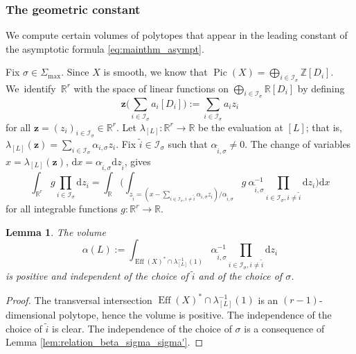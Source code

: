 \documentclass[11pt]{article}
\numberwithin{equation}{section}
\newcommand{\bfz}{\boldsymbol{z}}
\newcommand\ZZ{\mathbb{Z}}
\newcommand\RR{\mathbb{R}}
\newcommand{\ic}[1]{\mathcal{I}_{#1}}
\DeclareMathOperator{\pic}{Pic}
\DeclareMathOperator{\eff}{Eff}
\newtheorem{lemma}[theorem]{Lemma}
\theoremstyle{definition}
\numberwithin{theorem}{section}
\begin{document}
\subsubsection{The geometric constant}
We compute certain volumes of polytopes that appear in the leading constant
of the asymptotic formula \eqref{eq:mainthm_asympt}.

Fix $\sigma\in\Sigma_{\max}$.
Since $X$ is smooth, we know that $\pic(X)=\bigoplus_{i\in\ic{\sigma}}\ZZ[D_i]$.
We~iden\-ti\-fy~$\RR^r$ with the space of linear functions on
$\bigoplus_{i\in\ic{\sigma}}\RR[D_{i}]$ by defining
\[
\bfz\biggl (\sum_{i\in\ic{\sigma}}a_i[D_{i}]\biggr):=\sum_{i\in\ic{\sigma}}a_iz_i
\]
for all $\bfz=(z_i)_{i\in\ic{\sigma}}\in\RR^r$.
Let $\lambda_{[L]}:\RR^r\to\RR$ be the evaluation at $[L]$;
that is, $\lambda_{[L]}(\bfz)=\sum_{i\in\ic{\sigma}}\alpha_{i,\sigma} z_i$.
Fix $\tilde i\in\ic{\sigma}$ such that $\alpha_{\tilde i,\sigma}\neq0$.
The change of variables $x=\lambda_{[L]}(\bfz)$,
$\mathrm d x=\alpha_{\tilde i,\sigma}\mathrm d z_{\tilde i}$, gives
\[
\int_{\RR^r} g\prod_{i\in\ic{\sigma}}\mathrm d z_i=
\int_\RR\biggl (
\int_{z_{\tilde i}=\left (x-\sum_{i\in\ic{\sigma}, i\neq\tilde i}\alpha_{i,\sigma} z_i \right)/\alpha_{\tilde i,\sigma}}
g\ \alpha_{\tilde i,\sigma}^{-1}\prod_{i\in\ic{\sigma}, i\neq\tilde i}\mathrm dz_i\biggr)\mathrm d x
\]
for all integrable functions $g:\RR^r\to \RR$.
\begin{lemma}
\label{lem:alpha_peyre}
The volume
\[
\alpha(L):=
\int_{\eff(X)^*\cap \lambda_{[L]}^{-1}(1)}
\alpha_{\tilde i,\sigma}^{-1}\prod_{i\in \ic{\sigma}, i\neq\tilde i}\mathrm dz_i
\]
is positive and independent of the choice of $\tilde i$ and of the choice of $\sigma$.
\end{lemma}
\begin{proof}
The transversal intersection $\eff(X)^*\cap \lambda_{[L]}^{-1}(1)$
is an $(r-1)$-dimensional polytope, hence the volume is positive.
The independence of the choice of $\tilde i$ is clear.
The independence of the choice of $\sigma$ is a consequence of
Lemma \ref{lem:relation_beta_sigma_sigma'}.
\end{proof}
\end{document}
